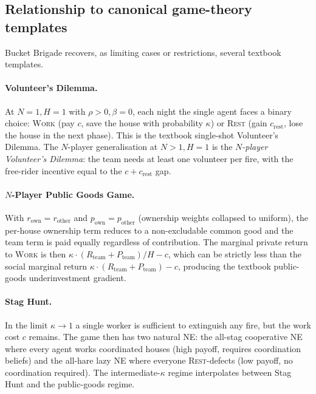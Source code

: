 \documentclass{anvil-paper}
\begin{document}
\subsection{Relationship to canonical game-theory templates}
\label{app:envspec:templates}

Bucket Brigade recovers, as limiting cases or restrictions, several
textbook templates.

\paragraph{Volunteer's Dilemma.}
At $N{=}1,H{=}1$ with $\rho>0,\beta{=}0$, each night the single agent
faces a binary choice: \textsc{Work} (pay $c$, save the house with
probability $\kappa$) or \textsc{Rest} (gain $c_{\text{rest}}$, lose the
house in the next phase). This is the textbook single-shot Volunteer's
Dilemma. The $N$-player generalisation at $N>1,H=1$ is the
\emph{$N$-player Volunteer's Dilemma}: the team needs at least one
volunteer per fire, with the free-rider incentive equal to the
$c+c_{\text{rest}}$ gap.

\paragraph{$N$-Player Public Goods Game.}
With $r_{\text{own}}=r_{\text{other}}$ and $p_{\text{own}}=p_{\text{other}}$
(ownership weights collapsed to uniform), the per-house ownership term
reduces to a non-excludable common good and the team term is paid equally
regardless of contribution. The marginal private return to \textsc{Work}
is then $\kappa\cdot(R_{\text{team}}+P_{\text{team}})/H-c$, which can be
strictly less than the social marginal return $\kappa\cdot
(R_{\text{team}}+P_{\text{team}})-c$, producing the textbook public-goods
underinvestment gradient.

\paragraph{Stag Hunt.}
In the limit $\kappa\to 1$ a single worker is sufficient to extinguish
any fire, but the work cost $c$ remains. The game then has two natural
NE: the all-stag cooperative NE where every agent works coordinated
houses (high payoff, requires coordination beliefs) and the all-hare
lazy NE where everyone \textsc{Rest}-defects (low payoff, no coordination
required). The intermediate-$\kappa$ regime interpolates between Stag
Hunt and the public-goods regime.
\end{document}
